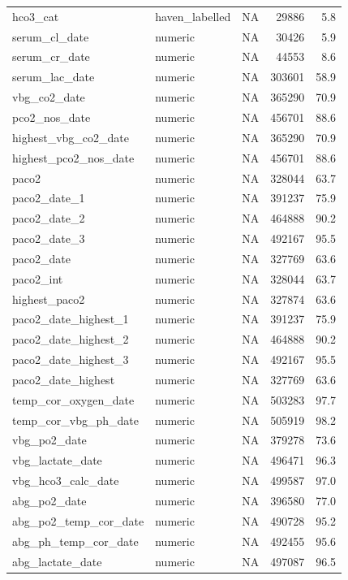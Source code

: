 \documentclass[
  11pt,
  letterpaper,
  DIV=11,
  numbers=noendperiod]{scrartcl}
\begin{document}
\begin{longtable*}{llrrr}
\addlinespace
hco3\_cat & haven\_labelled & NA & 29886 & 5.8\\
serum\_cl\_date & numeric & NA & 30426 & 5.9\\
serum\_cr\_date & numeric & NA & 44553 & 8.6\\
serum\_lac\_date & numeric & NA & 303601 & 58.9\\
vbg\_co2\_date & numeric & NA & 365290 & 70.9\\
\addlinespace
pco2\_nos\_date & numeric & NA & 456701 & 88.6\\
highest\_vbg\_co2\_date & numeric & NA & 365290 & 70.9\\
highest\_pco2\_nos\_date & numeric & NA & 456701 & 88.6\\
paco2 & numeric & NA & 328044 & 63.7\\
paco2\_date\_1 & numeric & NA & 391237 & 75.9\\
\addlinespace
paco2\_date\_2 & numeric & NA & 464888 & 90.2\\
paco2\_date\_3 & numeric & NA & 492167 & 95.5\\
paco2\_date & numeric & NA & 327769 & 63.6\\
paco2\_int & numeric & NA & 328044 & 63.7\\
highest\_paco2 & numeric & NA & 327874 & 63.6\\
\addlinespace
paco2\_date\_highest\_1 & numeric & NA & 391237 & 75.9\\
paco2\_date\_highest\_2 & numeric & NA & 464888 & 90.2\\
paco2\_date\_highest\_3 & numeric & NA & 492167 & 95.5\\
paco2\_date\_highest & numeric & NA & 327769 & 63.6\\
temp\_cor\_oxygen\_date & numeric & NA & 503283 & 97.7\\
\addlinespace
temp\_cor\_vbg\_ph\_date & numeric & NA & 505919 & 98.2\\
vbg\_po2\_date & numeric & NA & 379278 & 73.6\\
vbg\_lactate\_date & numeric & NA & 496471 & 96.3\\
vbg\_hco3\_calc\_date & numeric & NA & 499587 & 97.0\\
abg\_po2\_date & numeric & NA & 396580 & 77.0\\
\addlinespace
abg\_po2\_temp\_cor\_date & numeric & NA & 490728 & 95.2\\
abg\_ph\_temp\_cor\_date & numeric & NA & 492455 & 95.6\\
abg\_lactate\_date & numeric & NA & 497087 & 96.5\\

\end{longtable*}
\end{document}
